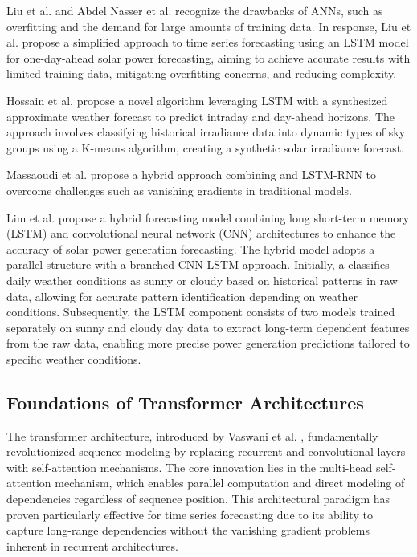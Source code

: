 \documentclass[12pt]{uomthesis}
\begin{document}
Liu et al. \cite{liu2021simplified} and Abdel Nasser et al. \cite{abdel2019accurate} recognize the drawbacks of ANNs, such as overfitting and the demand for large amounts of training data. In response, Liu et al. propose a simplified approach to time series forecasting using an LSTM model for one-day-ahead solar power forecasting, aiming to achieve accurate results with limited training data, mitigating overfitting concerns, and reducing complexity. 

Hossain et al. \cite{hossain2020short} propose a novel algorithm leveraging LSTM with a synthesized approximate weather forecast to predict intraday and day-ahead horizons. The approach involves classifying historical irradiance data into dynamic types of sky groups using a K-means algorithm, creating a synthetic solar irradiance forecast.

Massaoudi et al. \cite{massaoudi2019novel} propose a hybrid approach combining   and LSTM-RNN to overcome challenges such as vanishing gradients in traditional models.

 Lim et al. \cite{lim2022solar} propose a hybrid forecasting model combining long short-term memory (LSTM) and convolutional neural network (CNN) architectures to enhance the accuracy of solar power generation forecasting. The hybrid model adopts a parallel structure with a branched CNN-LSTM approach. Initially, a  classifies daily weather conditions as sunny or cloudy based on historical patterns in raw data, allowing for accurate pattern identification depending on weather conditions. Subsequently, the LSTM component consists of two models trained separately on sunny and cloudy day data to extract long-term dependent features from the raw data, enabling more precise power generation predictions tailored to specific weather conditions.

\subsection{Foundations of Transformer Architectures}

The transformer architecture, introduced by Vaswani et al. \cite{vaswani2017attention}, fundamentally revolutionized sequence modeling by replacing recurrent and convolutional layers with self-attention mechanisms. The core innovation lies in the multi-head self-attention mechanism, which enables parallel computation and direct modeling of dependencies regardless of sequence position. This architectural paradigm has proven particularly effective for time series forecasting due to its ability to capture long-range dependencies without the vanishing gradient problems inherent in recurrent architectures.
\end{document}
